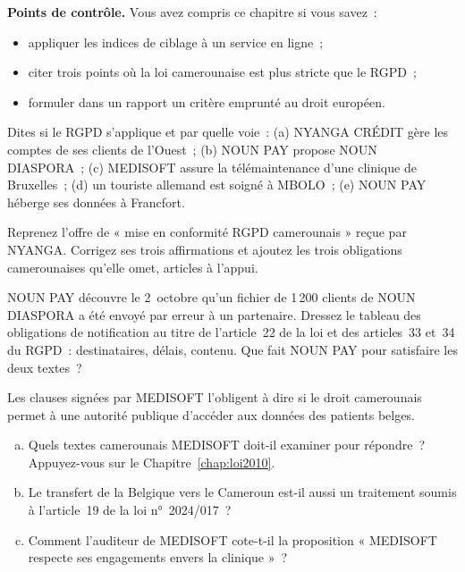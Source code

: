 \begin{boxinfo}
\textbf{Points de contrôle.} Vous avez compris ce chapitre si vous savez~:
\begin{itemize}
    \item appliquer les indices de ciblage à un service en ligne~;
    \item citer trois points où la loi camerounaise est plus stricte que le
          RGPD~;
    \item formuler dans un rapport un critère emprunté au droit européen.
\end{itemize}
\end{boxinfo}

\begin{boxexo}[title={\ding{45}\quad Exercice~4.1. Le RGPD s'applique-t-il \niveaubase}]
Dites si le RGPD s'applique et par quelle voie~: (a) NYANGA CRÉDIT gère les
comptes de ses clients de l'Ouest~; (b) NOUN PAY propose NOUN DIASPORA~;
(c) MEDISOFT assure la télémaintenance d'une clinique de Bruxelles~;
(d) un touriste allemand est soigné à MBOLO~; (e) NOUN PAY héberge ses
données à Francfort.
\end{boxexo}

\begin{boxexo}[title={\ding{45}\quad Exercice~4.2. L'offre du cabinet \niveaumoyen}]
Reprenez l'offre de « mise en conformité RGPD camerounais » reçue par
NYANGA. Corrigez ses trois affirmations et ajoutez les trois obligations
camerounaises qu'elle omet, articles à l'appui.
\end{boxexo}

\begin{boxexo}[title={\ding{45}\quad Exercice~4.3. Deux colonnes \niveaumoyen}]
NOUN PAY découvre le 2~octobre qu'un fichier de 1\,200 clients de NOUN
DIASPORA a été envoyé par erreur à un partenaire. Dressez le tableau des
obligations de notification au titre de l'article~22 de la loi et des
articles~33 et~34 du RGPD~: destinataires, délais, contenu. Que fait NOUN
PAY pour satisfaire les deux textes~?
\end{boxexo}

\begin{boxexo}[title={\ding{45}\quad Exercice~4.4. Les clauses de MEDISOFT \niveauexpert}]
Les clauses signées par MEDISOFT l'obligent à dire si le droit camerounais
permet à une autorité publique d'accéder aux données des patients belges.
\begin{enumerate}[(a)]
    \item Quels textes camerounais MEDISOFT doit-il examiner pour répondre~?
          Appuyez-vous sur le Chapitre~\ref{chap:loi2010}.
    \item Le transfert de la Belgique vers le Cameroun est-il aussi un
          traitement soumis à l'article~19 de la loi n°~2024/017~?
    \item Comment l'auditeur de MEDISOFT cote-t-il la proposition « MEDISOFT
          respecte ses engagements envers la clinique »~?
\end{enumerate}
\end{boxexo}

